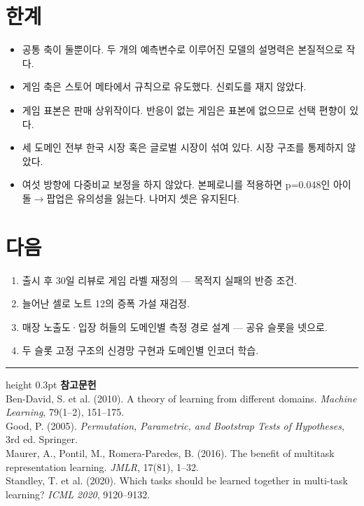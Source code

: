 \documentclass[10pt]{article}
\begin{document}
\section{한계}

\begin{itemize}[leftmargin=1.1em,itemsep=0.15em]
\item 공통 축이 둘뿐이다. 두 개의 예측변수로 이루어진 모델의 설명력은 본질적으로 작다.
\item 게임 축은 스토어 메타에서 규칙으로 유도했다. 신뢰도를 재지 않았다.
\item 게임 표본은 판매 상위작이다. 반응이 없는 게임은 표본에 없으므로 선택 편향이 있다.
\item 세 도메인 전부 한국 시장 혹은 글로벌 시장이 섞여 있다. 시장 구조를 통제하지 않았다.
\item 여섯 방향에 다중비교 보정을 하지 않았다. 본페로니를 적용하면 p=0.048인
      아이돌$\to$팝업은 유의성을 잃는다. 나머지 셋은 유지된다.
\end{itemize}

\section{다음}

\begin{enumerate}[leftmargin=1.3em,itemsep=0.15em]
\item 출시 후 30일 리뷰로 게임 라벨 재정의 --- 목적지 실패의 반증 조건.
\item 늘어난 셀로 노트 12의 증폭 가설 재검정.
\item 매장 노출도·입장 허들의 도메인별 측정 경로 설계 --- 공유 슬롯을 넷으로.
\item 두 슬롯 고정 구조의 신경망 구현과 도메인별 인코더 학습.
\end{enumerate}

\vspace{0.6em}
\hrule height 0.3pt
\vspace{0.5em}
{\footnotesize
\textbf{참고문헌}\\[0.3em]
Ben-David, S. et al. (2010). A theory of learning from different domains.
\emph{Machine Learning}, 79(1--2), 151--175.\\[0.15em]
Good, P. (2005). \emph{Permutation, Parametric, and Bootstrap Tests of Hypotheses},
3rd ed. Springer.\\[0.15em]
Maurer, A., Pontil, M., Romera-Paredes, B. (2016). The benefit of multitask
representation learning. \emph{JMLR}, 17(81), 1--32.\\[0.15em]
Standley, T. et al. (2020). Which tasks should be learned together in multi-task
learning? \emph{ICML 2020}, 9120--9132.
}
\end{document}
